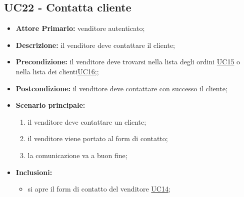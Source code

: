 \subsection{UC22 - Contatta cliente}
\label{UC22}
\begin{itemize}
    \item \textbf{Attore Primario:} venditore autenticato;
    \item \textbf{Descrizione:} il venditore deve contattare il cliente;
    \item \textbf{Precondizione:} il venditore deve trovarsi nella lista degli ordini \hyperref[UC15]{UC15} o nella lista dei clienti\hyperref[UC16]{UC16};;
    \item \textbf{Postcondizione:} il venditore deve contattare con successo il cliente;
    \item \textbf{Scenario principale:}
    \begin{enumerate}
        \item il venditore deve contattare un cliente;
        \item il venditore viene portato al form di contatto;
        \item la comunicazione va a buon fine;
    \end{enumerate}
    \item \textbf{Inclusioni:}
    \begin{itemize}
        \item si apre il form di contatto del venditore \hyperref[UC14]{UC14};
    \end{itemize}
\end{itemize}